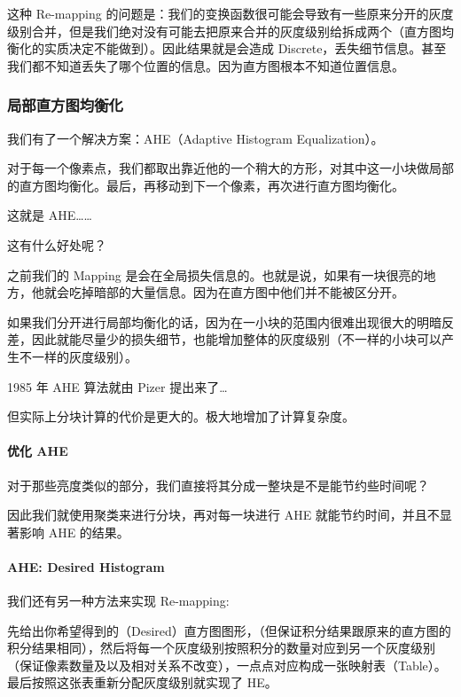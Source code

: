 \documentclass[
]{article}
\begin{document}
这种 Re-mapping
的问题是：我们的变换函数很可能会导致有一些原来分开的灰度级别合并，但是我们绝对没有可能去把原来合并的灰度级别给拆成两个（直方图均衡化的实质决定不能做到）。因此结果就是会造成
Discrete，丢失细节信息。甚至我们都不知道丢失了哪个位置的信息。因为直方图根本不知道位置信息。

\hypertarget{header-n16}{%
\subsubsection{局部直方图均衡化}\label{header-n16}}

我们有了一个解决方案：AHE（Adaptive Histogram Equalization）。

对于每一个像素点，我们都取出靠近他的一个稍大的方形，对其中这一小块做局部的直方图均衡化。最后，再移动到下一个像素，再次进行直方图均衡化。

这就是 AHE\ldots\ldots{}

这有什么好处呢？

之前我们的 Mapping
是会在全局损失信息的。也就是说，如果有一块很亮的地方，他就会吃掉暗部的大量信息。因为在直方图中他们并不能被区分开。

如果我们分开进行局部均衡化的话，因为在一小块的范围内很难出现很大的明暗反差，因此就能尽量少的损失细节，也能增加整体的灰度级别（不一样的小块可以产生不一样的灰度级别）。

1985 年 AHE 算法就由 Pizer 提出来了\ldots{}

但实际上分块计算的代价是更大的。极大地增加了计算复杂度。

\hypertarget{header-n25}{%
\paragraph{优化 AHE}\label{header-n25}}

对于那些亮度类似的部分，我们直接将其分成一整块是不是能节约些时间呢？

因此我们就使用聚类来进行分块，再对每一块进行 AHE
就能节约时间，并且不显著影响 AHE 的结果。

\hypertarget{header-n28}{%
\paragraph{AHE: Desired Histogram}\label{header-n28}}

我们还有另一种方法来实现 Re-mapping:

先给出你希望得到的（Desired）直方图图形，（但保证积分结果跟原来的直方图的积分结果相同），然后将每一个灰度级别按照积分的数量对应到另一个灰度级别（保证像素数量及以及相对关系不改变），一点点对应构成一张映射表（Table）。最后按照这张表重新分配灰度级别就实现了
HE。
\end{document}

